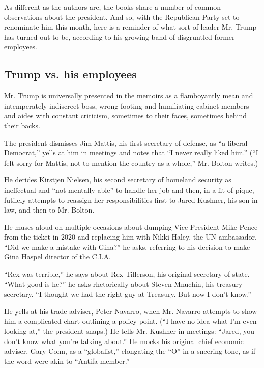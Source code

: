 As different as the authors are, the books share a number of common
observations about the president. And so, with the Republican Party set
to renominate him this month, here is a reminder of what sort of leader
Mr. Trump has turned out to be, according to his growing band of
disgruntled former employees.

\hypertarget{trump-vs-his-employees}{%
\subsection{Trump vs. his employees}\label{trump-vs-his-employees}}

Mr. Trump is universally presented in the memoirs as a flamboyantly mean
and intemperately indiscreet boss, wrong-footing and humiliating cabinet
members and aides with constant criticism, sometimes to their faces,
sometimes behind their backs.

The president dismisses Jim Mattis, his first secretary of defense, as
``a liberal Democrat,'' yells at him in meetings and notes that ``I
never really liked him.'' (``I felt sorry for Mattis, not to mention the
country as a whole,'' Mr. Bolton writes.)

He derides Kirstjen Nielsen, his second secretary of homeland security
as ineffectual and ``not mentally able'' to handle her job and then, in
a fit of pique, futilely attempts to reassign her responsibilities first
to Jared Kushner, his son-in-law, and then to Mr. Bolton.

He muses aloud on multiple occasions about dumping Vice President Mike
Pence from the ticket in 2020 and replacing him with Nikki Haley, the UN
ambassador. ``Did we make a mistake with Gina?'' he asks, referring to
his decision to make Gina Haspel director of the C.I.A.

``Rex was terrible,'' he says about Rex Tillerson, his original
secretary of state. ``What good is he?'' he asks rhetorically about
Steven Mnuchin, his treasury secretary. ``I thought we had the right guy
at Treasury. But now I don't know.''

He yells at his trade adviser, Peter Navarro, when Mr. Navarro attempts
to show him a complicated chart outlining a policy point. (``I have no
idea what I'm even looking at,'' the president snaps.) He tells Mr.
Kushner in meetings: ``Jared, you don't know what you're talking
about.'' He mocks his original chief economic adviser, Gary Cohn, as a
``globalist,'' elongating the ``O'' in a sneering tone, as if the word
were akin to ``Antifa member.''

